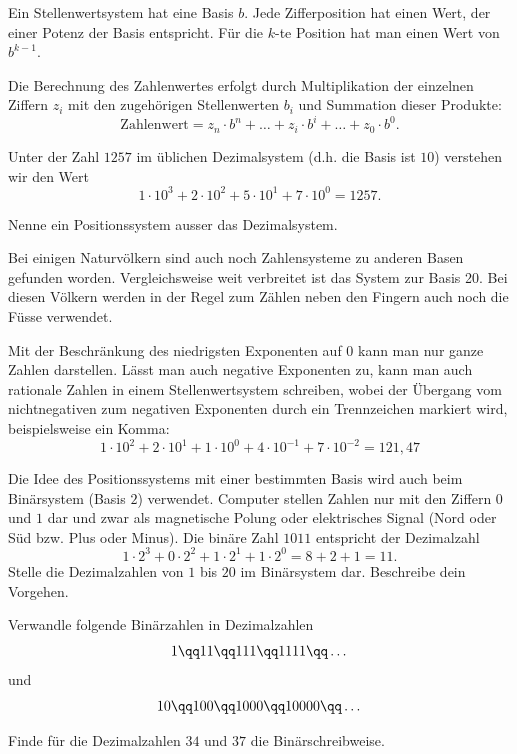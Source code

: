 \documentclass[%
11pt,%
twoside,%
titlepage,%
german,%
]{scrartcl}
\begin{document}
Ein Stellenwertsystem hat eine Basis $b$. Jede Zifferposition hat einen Wert, der einer Potenz der Basis entspricht. F\"ur die $k$-te Position hat man einen Wert von $b^{k-1}$.

Die Berechnung des Zahlenwertes erfolgt durch Multiplikation der einzelnen Ziffern $z_i$ mit den zugeh\"origen Stellenwerten $b_i$ und Summation dieser Produkte:
$$\text{Zahlenwert} = z_n\cdot b^n+\dots+z_i\cdot b^i+\dots+z_0\cdot b^0.$$
\begin{bsp}
Unter
der Zahl $1257$ im \"ublichen Dezimalsystem (d.h. die Basis ist $10$) verstehen wir den Wert
$$1\cdot10^3+2\cdot10^2+5\cdot10^1+7\cdot10^0 = 1257.$$
\end{bsp}
\begin{ueb}
Nenne ein Positionssystem ausser das Dezimalsystem.
\end{ueb}
Bei einigen Naturv\"olkern sind auch noch Zahlensysteme zu anderen Basen gefunden worden. Vergleichsweise weit verbreitet ist das System zur Basis 20. Bei diesen V\"olkern werden in der Regel zum Z\"ahlen neben den Fingern auch noch die F\"usse verwendet.

Mit der Beschr\"ankung des niedrigsten Exponenten auf $0$ kann man nur ganze Zahlen darstellen. L\"asst man auch negative Exponenten zu, kann man auch rationale Zahlen in einem Stellenwertsystem schreiben, wobei der \"Ubergang vom nichtnegativen zum negativen Exponenten durch ein Trennzeichen markiert wird, beispielsweise ein Komma:
$$1\cdot10^2+2\cdot10^1+1\cdot10^0+4\cdot10^{-1}+7\cdot10^{-2}=121,47$$

\begin{ueb}[binär]
Die Idee des Positionssystems mit einer bestimmten Basis wird auch beim Bin\"arsystem (Basis $2$) verwendet. Computer stellen Zahlen nur mit den Ziffern $0$ und $1$ dar und zwar als magnetische Polung oder elektrisches Signal (Nord oder S\"ud bzw. Plus oder Minus).
Die bin\"are Zahl $1011$ entspricht der Dezimalzahl
$$1\cdot2^3+0\cdot2^2+1\cdot2^1+1\cdot2^0=8+2+1=11.$$
Stelle die Dezimalzahlen von $1$ bis $20$ im Bin\"arsystem dar. Beschreibe dein Vorgehen.
\end{ueb}
\begin{ueb}
Verwandle folgende Bin\"arzahlen in Dezimalzahlen
$$1\qq11\qq111\qq1111\qq\dots$$
und
$$10\qq100\qq1000\qq10000\qq\dots$$
\end{ueb}
\begin{ueb}
Finde f\"ur die Dezimalzahlen $34$ und $37$ die Bin\"arschreibweise.
\end{ueb}
\end{document}
